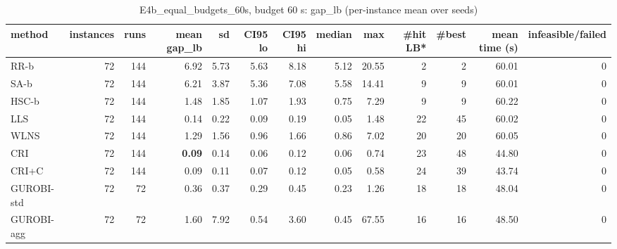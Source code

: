 \begin{table}[htbp]
\centering
\small
\caption{E4b\_equal\_budgets\_60s, budget 60 s: gap\_lb (per-instance mean over seeds)}
\label{tab:E4b_equal_budgets_60s_b60_summary}
\begin{tabular}{lrrrrrrrrrrrr}
\toprule
method & instances & runs & mean gap\_lb & sd & CI95 lo & CI95 hi & median & max & \#hit LB* & \#best & mean time (s) & infeasible/failed \\
\midrule
RR-b & 72 & 144 & 6.92 & 5.73 & 5.63 & 8.18 & 5.12 & 20.55 & 2 & 2 & 60.01 & 0 \\
SA-b & 72 & 144 & 6.21 & 3.87 & 5.36 & 7.08 & 5.58 & 14.41 & 9 & 9 & 60.01 & 0 \\
HSC-b & 72 & 144 & 1.48 & 1.85 & 1.07 & 1.93 & 0.75 & 7.29 & 9 & 9 & 60.22 & 0 \\
LLS & 72 & 144 & 0.14 & 0.22 & 0.09 & 0.19 & 0.05 & 1.48 & 22 & 45 & 60.02 & 0 \\
WLNS & 72 & 144 & 1.29 & 1.56 & 0.96 & 1.66 & 0.86 & 7.02 & 20 & 20 & 60.05 & 0 \\
CRI & 72 & 144 & \textbf{0.09} & 0.14 & 0.06 & 0.12 & 0.06 & 0.74 & 23 & 48 & 44.80 & 0 \\
CRI+C & 72 & 144 & 0.09 & 0.11 & 0.07 & 0.12 & 0.05 & 0.58 & 24 & 39 & 43.74 & 0 \\
GUROBI-std & 72 & 72 & 0.36 & 0.37 & 0.29 & 0.45 & 0.23 & 1.26 & 18 & 18 & 48.04 & 0 \\
GUROBI-agg & 72 & 72 & 1.60 & 7.92 & 0.54 & 3.60 & 0.45 & 67.55 & 16 & 16 & 48.50 & 0 \\
\bottomrule
\end{tabular}
\end{table}
